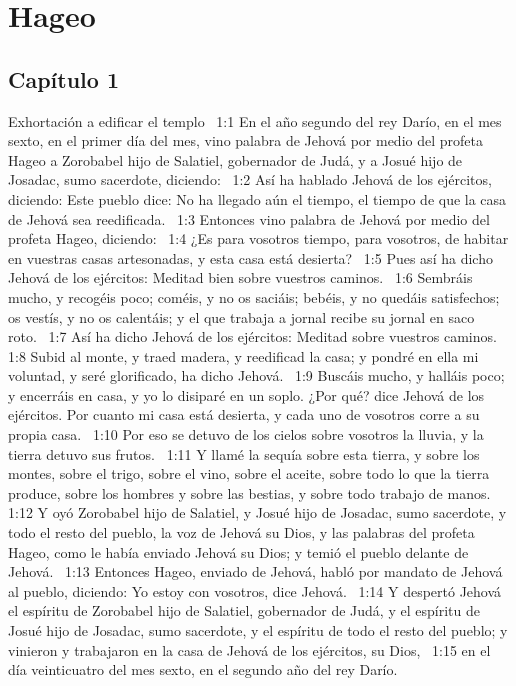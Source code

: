 \chapter{Hageo}
\section*{Capítulo 1 }
Exhortación a edificar el templo  
1:1 En el año segundo del rey Darío, en el mes sexto, en el primer día del mes, vino palabra de Jehová por medio del profeta Hageo a Zorobabel hijo de Salatiel, gobernador de Judá, y a Josué hijo de Josadac, sumo sacerdote, diciendo:  
1:2 Así ha hablado Jehová de los ejércitos, diciendo: Este pueblo dice: No ha llegado aún el tiempo, el tiempo de que la casa de Jehová sea reedificada.  
1:3 Entonces vino palabra de Jehová por medio del profeta Hageo, diciendo:  
1:4 ¿Es para vosotros tiempo, para vosotros, de habitar en vuestras casas artesonadas, y esta casa está desierta?  
1:5 Pues así ha dicho Jehová de los ejércitos: Meditad bien sobre vuestros caminos.  
1:6 Sembráis mucho, y recogéis poco; coméis, y no os saciáis; bebéis, y no quedáis satisfechos; os vestís, y no os calentáis; y el que trabaja a jornal recibe su jornal en saco roto.  
1:7 Así ha dicho Jehová de los ejércitos: Meditad sobre vuestros caminos.  
1:8 Subid al monte, y traed madera, y reedificad la casa; y pondré en ella mi voluntad, y seré glorificado, ha dicho Jehová.  
1:9 Buscáis mucho, y halláis poco; y encerráis en casa, y yo lo disiparé en un soplo. ¿Por qué? dice Jehová de los ejércitos. Por cuanto mi casa está desierta, y cada uno de vosotros corre a su propia casa.  
1:10 Por eso se detuvo de los cielos sobre vosotros la lluvia, y la tierra detuvo sus frutos.  
1:11 Y llamé la sequía sobre esta tierra, y sobre los montes, sobre el trigo, sobre el vino, sobre el aceite, sobre todo lo que la tierra produce, sobre los hombres y sobre las bestias, y sobre todo trabajo de manos.  
1:12 Y oyó Zorobabel hijo de Salatiel, y Josué hijo de Josadac, sumo sacerdote, y todo el resto del pueblo, la voz de Jehová su Dios, y las palabras del profeta Hageo, como le había enviado Jehová su Dios; y temió el pueblo delante de Jehová.  
1:13 Entonces Hageo, enviado de Jehová, habló por mandato de Jehová al pueblo, diciendo: Yo estoy con vosotros, dice Jehová.  
1:14 Y despertó Jehová el espíritu de Zorobabel hijo de Salatiel, gobernador de Judá, y el espíritu de Josué hijo de Josadac, sumo sacerdote, y el espíritu de todo el resto del pueblo; y vinieron y trabajaron en la casa de Jehová de los ejércitos, su Dios,  
1:15 en el día veinticuatro del mes sexto, en el segundo año del rey Darío.  
